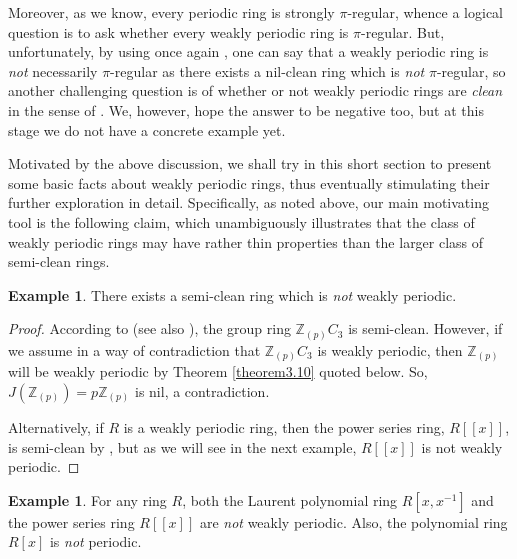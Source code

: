 \documentclass[12pt]{amsart}
\theoremstyle{definition}
\newtheorem{ex}[thm]{Example}
\theoremstyle{remark}
\numberwithin{equation}{section}
\begin{document}
Moreover, as we know, every periodic ring is strongly $\pi$-regular, whence a logical question is to ask whether every weakly periodic ring is $\pi$-regular. But, unfortunately, by using once again \cite[Example 3.2]{Ster}, one can say that a weakly periodic ring is {\it not} necessarily $\pi$-regular as there exists a nil-clean ring which is {\it not} $\pi$-regular, so another challenging question is of whether or not weakly periodic rings are {\it clean} in the sense of \cite{N}. We, however, hope the answer to be negative too, but at this stage we do not have a concrete example yet.

Motivated by the above discussion, we shall try in this short section to present some basic facts about weakly periodic rings, thus eventually stimulating their further exploration in detail. Specifically, as noted above, our main motivating tool is the following claim, which unambiguously illustrates that the class of weakly periodic rings may have rather thin properties than the larger class of semi-clean rings.

\begin{ex} There exists a semi-clean ring which is {\it not} weakly periodic.
\end{ex}

\begin{proof} According to \cite{Ye} (see also \cite{McGov}), the group ring $\mathbb{Z}_{(p)}C_3$ is semi-clean. However, if we assume in a way of contradiction that $\mathbb{Z}_{(p)}C_3$ is weakly periodic, then $\mathbb{Z}_{(p)}$ will be weakly periodic by Theorem \ref{theorem3.10} quoted below. So, $J(\mathbb{Z}_{(p)})=p\mathbb{Z}_{(p)}$ is nil, a contradiction.

Alternatively, if $R$ is a weakly periodic ring, then the power series ring, $R[[x]]$, is semi-clean by \cite[Proposition 3.3]{Ye}, but as we will see in the next example, $R[[x]]$ is not weakly periodic.
\end{proof}

\begin{ex} For any ring $R$, both the Laurent polynomial ring $R[x,x^{-1}]$ and the power series ring $R[[x]]$ are {\it not} weakly periodic. Also, the polynomial ring $R[x]$ is {\it not} periodic.
\end{ex}
\end{document}
